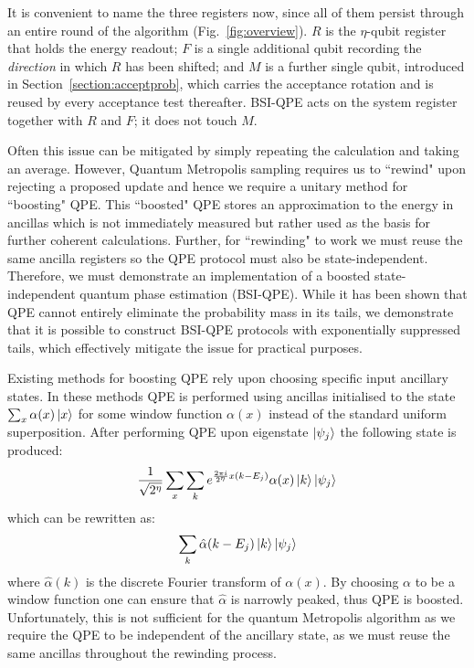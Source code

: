 \documentclass[aps,floatfix,10pt,amssymb,amsfont,amsmath,superscriptaddress,float,nofootinbib,longbibliography,nobalancelastpage,twocolumn]{revtex4-2}
\begin{document}
It is convenient to name the three registers now, since all of them persist through an entire round of the algorithm (Fig.~\ref{fig:overview}). $R$ is the $\eta$-qubit register that holds the energy readout; $F$ is a single additional qubit recording the \emph{direction} in which $R$ has been shifted; and $M$ is a further single qubit, introduced in Section~\ref{section:acceptprob}, which carries the acceptance rotation and is reused by every acceptance test thereafter. BSI-QPE acts on the system register together with $R$ and $F$; it does not touch $M$.

Often this issue can be mitigated by simply repeating the calculation and taking an average. However, Quantum Metropolis sampling requires us to ``rewind" upon rejecting a proposed update and hence we require a unitary method for ``boosting" QPE. This ``boosted" QPE stores an approximation to the energy in ancillas which is not immediately measured but rather used as the basis for further coherent calculations. Further, for ``rewinding" to work we must reuse the same ancilla registers so the QPE protocol must also be state-independent. Therefore, we must demonstrate an implementation of a boosted state-independent quantum phase estimation (BSI-QPE). While it has been shown \cite{chen2023quantumthermalstatepreparation} that QPE cannot entirely eliminate the probability mass in its tails, we demonstrate that it is possible to construct BSI-QPE protocols with exponentially suppressed tails, which effectively mitigate the issue for practical purposes. 

Existing methods for boosting QPE rely upon choosing specific input ancillary states. In these methods QPE is performed using ancillas initialised to the state $\sum_x \alpha(x) \ket{x}$ for some window function $\alpha(x)$ instead of the standard uniform superposition. After performing QPE upon eigenstate $\ket{\psi_j}$ the following state is produced:
\begin{equation}
   \frac{1}{\sqrt{2^{\eta}}} \sum_x \sum_k e^{\frac{2 \pi i}{2^{\eta}}x(k-E_j)} \alpha(x)\ket{k}\ket{\psi_j}
\end{equation}
which can be rewritten as:
\begin{equation}
    \sum_k \hat\alpha(k-E_j) \ket{k}\ket{\psi_j}
\end{equation}
where $\hat \alpha(k)$ is the discrete Fourier transform of $\alpha(x)$. By choosing $\alpha$ to be a window function one can ensure that $\hat \alpha$ is narrowly peaked, thus QPE is boosted. Unfortunately, this is not sufficient for the quantum Metropolis algorithm as we require the QPE to be independent of the ancillary state, as we must reuse the same ancillas throughout the rewinding process. 
\end{document}
